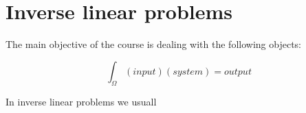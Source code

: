 \chapter{Inverse linear problems}


The main objective of the course is dealing with the following objects:

\begin{equation}
	\int_{\Omega} (input) (system) = output
\end{equation}

In inverse linear problems we usuall